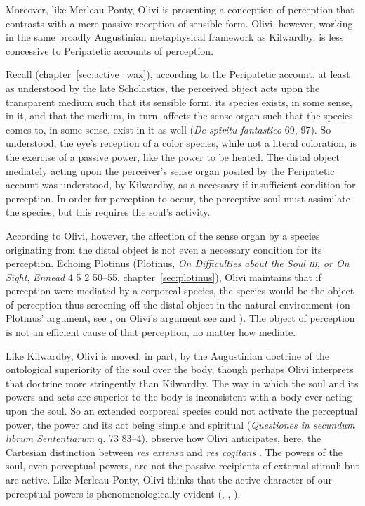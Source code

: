 Moreover, like Merleau-Ponty, Olivi is presenting a conception of perception that contrasts with a mere passive reception of sensible form. Olivi, however, working in the same broadly Augustinian metaphysical framework as Kilwardby, is less concessive to Peripatetic accounts of perception. 

Recall (chapter~\ref{sec:active_wax}), according to the Peripatetic account, at least as understood by the late Scholastics, the perceived object acts upon the transparent medium such that its sensible form, its species exists, in some sense, in it, and that the medium, in turn, affects the sense organ such that the species comes to, in some sense, exist in it as well (\emph{De spiritu fantastico} 69, 97). So understood, the eye's reception of a color species, while not a literal coloration, is the exercise of a passive power, like the power to be heated. The distal object mediately acting upon the perceiver's sense organ posited by the Peripatetic account was understood, by Kilwardby, as a necessary if insufficient condition for perception. In order for perception to occur, the perceptive soul must assimilate the species, but this requires the soul's activity. 

According to Olivi, however, the affection of the sense organ by a species originating from the distal object is not even a necessary condition for its perception. Echoing Plotinus (Plotinus, \emph{On Difficulties about the Soul \textsc{iii}, or On Sight}, \emph{Ennead} 4 5 2 50–55, chapter~\ref{sec:plotinus}), Olivi maintains that if perception were mediated by a corporeal species, the species would be the object of perception thus screening off the distal object in the natural environment (on Plotinus' argument, see \citealt[chapter 3]{Emilsson:1988uq}, on Olivi's argument see \citealt[43--45, especially n. 53]{Tachau:1988aa} and \citealt[chapter 7.3]{Pasnau:1997aa}). The object of perception is not an efficient cause of that perception, no matter how mediate. 

Like Kilwardby, Olivi is moved, in part, by the Augustinian doctrine of the ontological superiority of the soul over the body, though perhaps Olivi interprets that doctrine more stringently than Kilwardby. The way in which the soul and its powers and acts are superior to the body is inconsistent with a body ever acting upon the soul. So an extended corporeal species could not activate the perceptual power, the power and its act being simple and spiritual (\emph{Questiones in secundum librum Sententiarum} q. 73 83--4). \citet[263]{Silva:2010zh} observe how Olivi anticipates, here, the Cartesian distinction between \emph{res extensa} and \emph{res cogitans} \citep[see also][46]{Tachau:1988aa}. The powers of the soul, even perceptual powers, are not the passive recipients of external stimuli but are active. Like Merleau-Ponty, Olivi thinks that the active character of our perceptual powers is phenomenologically evident (\citealt[3--26, 39---54]{Tachau:1988aa}, \citealt[236--47]{Pasnau:1997aa}, \citealt[143]{Toivanen:2013ul}). 

